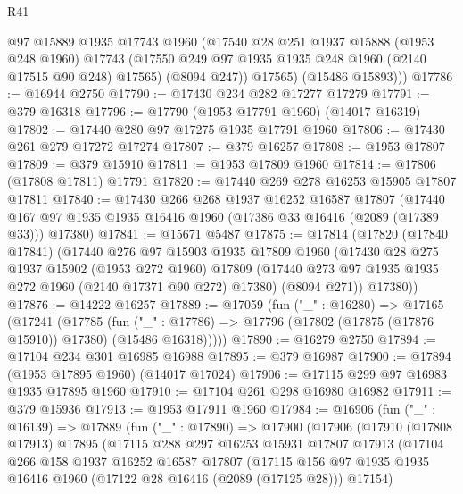 \begin{lexlean}{R41}
\begin{coremodule}
          @97
          @15889
          @1935
          @17743
          @1960
          (@17540
            @28
            @251
            @1937
            @15888
            (@1953 @248 @1960)
            @17743
            (@17550 @249 @97 @1935 @1935 @248 @1960 (@2140 @17515 @90 @248) @17565)
            (@8094 @247))
          @17565)
        (@15486 @15893)))
@17786 := @16944 @2750
@17790 := @17430 @234 @282 @17277 @17279
@17791 := @379 @16318
@17796 := @17790 (@1953 @17791 @1960) (@14017 @16319)
@17802 := @17440 @280 @97 @17275 @1935 @17791 @1960
@17806 := @17430 @261 @279 @17272 @17274
@17807 := @379 @16257
@17808 := @1953 @17807
@17809 := @379 @15910
@17811 := @1953 @17809 @1960
@17814 := @17806 (@17808 @17811) @17791
@17820 := @17440 @269 @278 @16253 @15905 @17807 @17811
@17840 := @17430
    @266
    @268
    @1937
    @16252
    @16587
    @17807
    (@17440 @167 @97 @1935 @1935 @16416 @1960 (@17386 @33 @16416 (@2089 (@17389 @33))) @17380)
@17841 := @15671 @5487
@17875 := @17814
    (@17820
      (@17840 @17841)
      (@17440
        @276
        @97
        @15903
        @1935
        @17809
        @1960
        (@17430
          @28
          @275
          @1937
          @15902
          (@1953 @272 @1960)
          @17809
          (@17440 @273 @97 @1935 @1935 @272 @1960 (@2140 @17371 @90 @272) @17380)
          (@8094 @271))
        @17380))
@17876 := @14222 @16257
@17889 := @17059
    (fun ("_" : @16280) =>
    @17165
      (@17241
        (@17785
          (fun ("_" : @17786) => @17796 (@17802 (@17875 (@17876 @15910)) @17380) (@15486 @16318)))))
@17890 := @16279 @2750
@17894 := @17104 @234 @301 @16985 @16988
@17895 := @379 @16987
@17900 := @17894 (@1953 @17895 @1960) (@14017 @17024)
@17906 := @17115 @299 @97 @16983 @1935 @17895 @1960
@17910 := @17104 @261 @298 @16980 @16982
@17911 := @379 @15936
@17913 := @1953 @17911 @1960
@17984 := @16906
    (fun ("_" : @16139) =>
    @17889
      (fun ("_" : @17890) =>
      @17900
        (@17906
          (@17910
            (@17808 @17913)
            @17895
            (@17115
              @288
              @297
              @16253
              @15931
              @17807
              @17913
              (@17104
                @266
                @158
                @1937
                @16252
                @16587
                @17807
                (@17115
                  @156
                  @97
                  @1935
                  @1935
                  @16416
                  @1960
                  (@17122 @28 @16416 (@2089 (@17125 @28)))
                  @17154)

\end{coremodule}
\end{lexlean}
